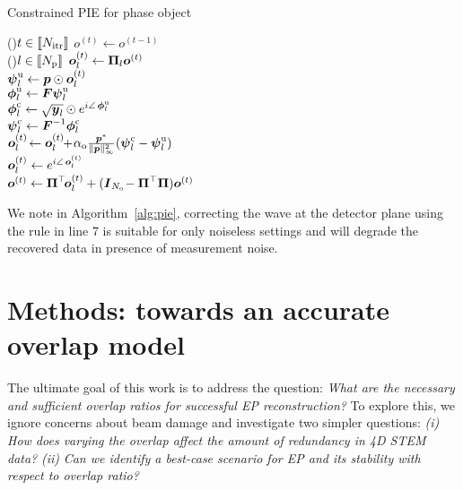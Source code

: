 \documentclass[11pt,draftclsnofoot,onecolumn]{IEEEtran}
\begin{document}
\setlength{\textfloatsep}{0pt}%
\begin{algorithm}[!t]
\caption{Constrained PIE for phase object}\label{alg:pie}
\For(){$t \in \llbracket N_{\rm itr}\rrbracket$}{
$o^{(t)} \leftarrow o^{(t-1)}$\\
\For(){$l \in \llbracket N_{\rm p} \rrbracket$}{
$\boldsymbol o^{(t)}_l \leftarrow  \boldsymbol \Pi_l \boldsymbol o^{(t)}$ \\
$\boldsymbol \psi^{\rm u}_l \leftarrow \boldsymbol p \odot  \boldsymbol o^{(t)}_l
$ \!\!\!\\
$\boldsymbol \phi^{\rm u}_l \leftarrow \boldsymbol F \boldsymbol \psi^{\rm u}_l$ \\
$\boldsymbol \phi^{\rm c}_l  \leftarrow \sqrt{\boldsymbol y_l}\odot e^{i\angle\,\boldsymbol \phi^{\rm u}_l}$  \\
$\boldsymbol \psi^{\rm c}_l \leftarrow \boldsymbol F^{-1} \boldsymbol \phi^{\rm c}_l
$ \\
$\boldsymbol o^{(t)}_l \!\leftarrow \boldsymbol o^{(t)}_l\! \!+ \!\alpha_{\rm o}\frac{\boldsymbol p^*}{\| \boldsymbol p\|^2_{\infty}}(\boldsymbol \psi^{\rm c}_l - \boldsymbol \psi^{\rm u}_l)$\!\!\!\\
$\boldsymbol o^{(t)}_l \leftarrow e^{i\angle\,\boldsymbol o^{(t)}_l}$\\
$\boldsymbol o^{(t)} \leftarrow \boldsymbol \Pi^\top\! \boldsymbol o^{(t)}_l + (\boldsymbol I_{N_{\rm o}}\! - \boldsymbol \Pi^\top\boldsymbol \Pi)\boldsymbol o^{(t)}$\!\!
}
}
\end{algorithm}

\setlength{\textfloatsep}{2pt}%
We note in Algorithm~\ref{alg:pie}, correcting the wave at the detector plane using the rule in line 7 is suitable for only noiseless settings and will degrade the recovered data in presence of measurement noise.  

\section{Methods: towards an accurate overlap model}\label{sec:methods}
The ultimate goal of this work is to address the question: \textit{What are the necessary and sufficient overlap ratios for successful EP reconstruction?} To explore this, we ignore concerns about beam damage and investigate two simpler questions: \textit{(i)} \textit{How does varying the overlap affect the amount of redundancy in 4D STEM data?} \textit{(ii)} \textit{Can we identify a best-case scenario for EP and its stability with respect to overlap ratio?}
\end{document}
